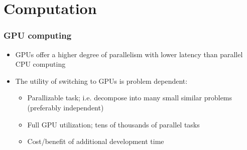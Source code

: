 \documentclass{beamer}
\begin{document}



\section{Computation}

\begin{frame}%
  \frametitle{GPU computing}
  \begin{itemize}
    \item GPUs offer a higher degree of parallelism with lower latency than parallel CPU computing
    \item The utility of switching to GPUs is problem dependent:
    \begin{itemize}
      \item Parallizable task; i.e. decompose into many small similar problems (preferably independent)
      \item Full GPU utilization; tens of thousands of parallel tasks
      \item Cost/benefit of additional development time
    \end{itemize}
  \end{itemize}
\end{frame}
\end{document}
